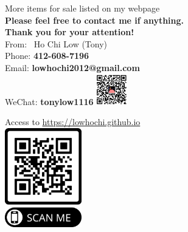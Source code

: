 \documentclass{article}[12pt]
\begin{document}
{\begin{minipage}[t][\textheight-27pt][t]{445pt}
\begin{minipage}[b]{0.5\textwidth}
{\color{red}\sc More items for sale listed on my webpage}\\
{\bf Please feel free to contact me if anything.}\\
{\bf Thank you for your attention!}\\
From: \, Ho Chi Low (Tony)\\
Phone: {\bf412-608-7196} \\
Email: {\bf lowhochi2012@gmail.com} \\
WeChat: {\bf tonylow1116} \quad \includegraphics[width=0.1\textwidth]{wechat_QRcode.png}
\end{minipage} 
\begin{minipage}[b]{0.5\textwidth}
\begin{center}
Access to \href{https://lowhochi.github.io}{\url{https://lowhochi.github.io}}\\[0.1in]
\includegraphics[width=0.25\textwidth]{qr2web.png}
\end{center}
\end{minipage}
%
\end{minipage}}
\end{document}
